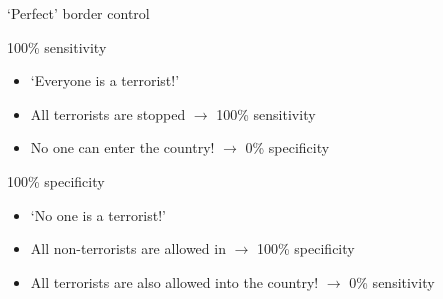 \begin{frame}{`Perfect' border control}
    \begin{block}{100\% sensitivity}
        \begin{itemize}
            \item `Everyone is a terrorist!'
            \pause
            \item All terrorists are stopped $\rightarrow$ 100\% sensitivity
            \pause
            \item No one can enter the country! $\rightarrow$ 0\% specificity
        \end{itemize}
    \end{block}
    \vfill\pause
    \begin{block}{100\% specificity}
        \begin{itemize}
            \item `No one is a terrorist!'
            \pause
            \item All non\hyp{}terrorists are allowed in $\rightarrow$ 100\% specificity
            \pause
            \item All terrorists are also allowed into the country! $\rightarrow$ 0\% sensitivity
        \end{itemize}
    \end{block}
\end{frame}

